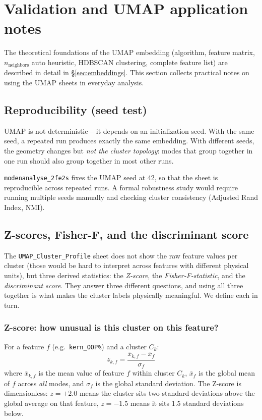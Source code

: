\documentclass[11pt,a4paper,twoside]{article}
\theoremstyle{remark}
\begin{document}
\section{Validation and UMAP application notes}

The theoretical foundations of the UMAP embedding (algorithm,
feature matrix, $n_\text{neighbors}$ auto heuristic, HDBSCAN
clustering, complete feature list) are described in detail in
\S\ref{sec:embeddings}. This section collects practical notes on
using the UMAP sheets in everyday analysis.

\subsection{Reproducibility (seed test)}

UMAP is not deterministic -- it depends on an initialization seed.
With the same seed, a repeated run produces exactly the same
embedding. With different seeds, the geometry changes but
\emph{not the cluster topology}: modes that group together in one
run should also group together in most other runs.

\texttt{modenanalyse\_2fe2s} fixes the UMAP seed at 42, so that the
sheet is reproducible across repeated runs. A formal robustness
study would require running multiple seeds manually and checking
cluster consistency (Adjusted Rand Index, NMI).

\subsection{Z-scores, Fisher-F, and the discriminant score}
\label{sec:zscore-fisher}

The \texttt{UMAP\_Cluster\_Profile} sheet does not show the raw
feature values per cluster (those would be hard to interpret
across features with different physical units), but three derived
statistics: the \emph{Z-score}, the \emph{Fisher-F-statistic}, and
the \emph{discriminant score}. They answer three different
questions, and using all three together is what makes the cluster
labels physically meaningful. We define each in turn.

\subsubsection*{Z-score: how unusual is this cluster on this feature?}

For a feature $f$ (e.g.\ \texttt{kern\_OOP\%}) and a cluster $C_k$:
\begin{equation}
  z_{k,f} = \frac{\bar{x}_{k,f} - \bar{x}_f}{\sigma_f}
\end{equation}
where $\bar{x}_{k,f}$ is the mean value of feature $f$ within
cluster $C_k$, $\bar{x}_f$ is the global mean of $f$ across
\emph{all} modes, and $\sigma_f$ is the global standard deviation.
The Z-score is dimensionless: $z = +2.0$ means the cluster sits
two standard deviations above the global average on that feature,
$z = -1.5$ means it sits 1.5 standard deviations below.
\end{document}
